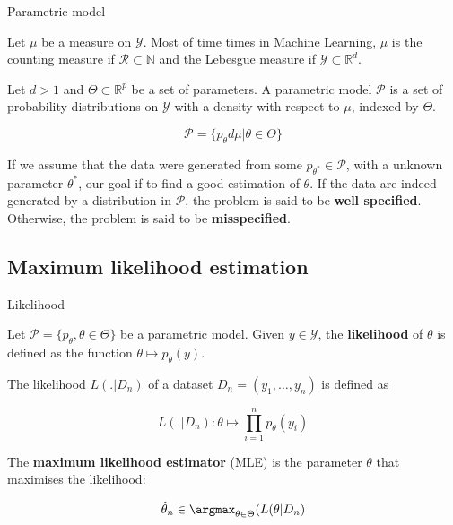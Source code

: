 \documentclass[
10pt, %
a4paper, %
oneside, %
headinclude,footinclude, %
BCOR5mm, %
]{scrartcl}
\begin{document}
\begin{definition}{Parametric model}

    Let $\mu$ be a measure on $ \mathcal{Y}$. Most of time times in Machine Learning, $\mu$ is the counting measure if $ \mathcal{R} \subset \mathbb{N} $ and the Lebesgue measure if $ \mathcal{Y} \subset \mathbb{R}^d$.

    Let $d>1$ and $ \Theta\subset \mathbb{R}^p$ be a set of parameters. A parametric model $ \mathcal{P} $ is a set of probability distributions on $ \mathcal{Y} $ with a density with respect to $\mu$, indexed by $ \Theta $.

    \begin{equation*}
	\mathcal{P}  = \{p_{\theta}d\mu|\theta \in \Theta \}
    \end{equation*}
\end{definition}

If we assume that the data were generated from some $p_{\theta^*}\in \mathcal{P} $, with a unknown parameter $ \theta^*$, our goal if to find a good estimation of $\theta$. If the data are indeed generated by a distribution in $ \mathcal{P} $, the problem is said to be \textbf{{well specified}}. Otherwise, the problem is said to be \textbf{{misspecified}}.

\subsection{\large\color{MidnightBlue}Maximum likelihood estimation}

\begin{definition}{Likelihood}

    Let $\mathcal{P}  = \{p_{\theta},\theta \in \Theta \}$ be a parametric model. Given $y\in \mathcal{Y} $, the \textbf{{likelihood}} of $\theta$ is defined as the function $ \theta\mapsto p_{\theta}(y)$.

    The likelihood $L(.|D_n)$ of a dataset $D_n = (y_1, \dots, y_n)$ is defined as

    \begin{equation*}
	L(.|D_n):\theta\mapsto \prod^{n}_{i=1} p_{\theta}(y_i)
    \end{equation*}

    The \textbf{{maximum likelihood estimator}}  (MLE) is the parameter $\theta$ that maximises the likelihood:

    \begin{equation*}
	\hat{\theta}_n \in \argmax_{\theta\in \Theta}( L(\theta|D_n)
    \end{equation*}

\end{definition}
\end{document}
